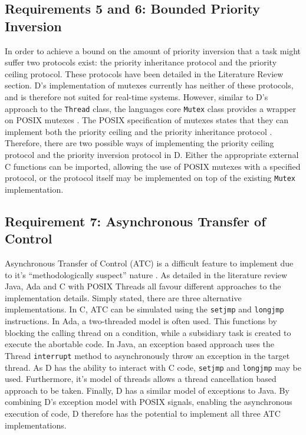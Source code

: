 \subsection{Requirements 5 and 6: Bounded Priority Inversion} %
In order to achieve a bound on the amount of priority inversion that a task
might suffer two protocols exist: the priority inheritance protocol and the
priority ceiling protocol. These protocols have been detailed in the 
Literature Review section. D's implementation of mutexes currently has
neither of these protocols, and is therefore not suited for real-time systems.
However, similar to D's approach to the \texttt{Thread} class, the languages
core \texttt{Mutex} class provides a wrapper on POSIX mutexes
\cite{dlang-github-mutex}. The POSIX specification of mutexes states that
they can implement both the priority ceiling and the priority inheritance protocol 
\cite{mutex-setprotocol}. Therefore, there are two possible ways of
implementing the priority ceiling protocol and the priority inversion protocol
in D. Either the appropriate external C functions can be imported, allowing the
use of POSIX mutexes with a specified protocol, or the protocol itself may be
implemented on top of the existing \texttt{Mutex} implementation. 

\subsection{Requirement 7: Asynchronous Transfer of Control} %
Asynchronous Transfer of Control (ATC) is a difficult feature to implement due to
it's ``methodologically suspect'' nature \cite{Brosgol:2002:ATC}. As detailed
in the literature review Java, Ada and C with POSIX Threads all favour
different approaches to the implementation details. Simply stated, there are
three alternative implementations. In C, ATC can be simulated using the
\texttt{setjmp} and \texttt{longjmp} instructions. In Ada, a
two-threaded model is often used. This functions by blocking the calling thread
on a condition, while a subsidiary task is created to execute the abortable
code. In Java, an exception based approach uses the Thread \texttt{interrupt}
method to asynchronously throw an exception in the target thread. As D has the
ability to interact with C code, \texttt{setjmp} and \texttt{longjmp} may be
used. Furthermore, it's model of threads allows a thread cancellation based
approach to be taken. Finally, D has a similar model of exceptions to Java. By
combining D's exception model with POSIX signals, enabling the asynchronous
execution of code, D therefore has the potential to implement all three ATC
implementations. 

